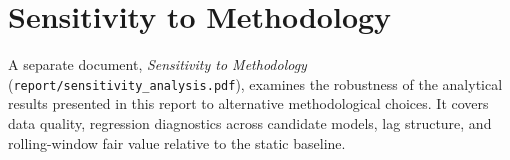 \section{Sensitivity to Methodology}
A separate document, \emph{Sensitivity to Methodology}
(\texttt{report/sensitivity\_analysis.pdf}), examines the robustness of the
analytical results presented in this report to alternative methodological
choices. It covers data quality, regression diagnostics across candidate models,
lag structure, and rolling-window fair value relative to the static baseline.
